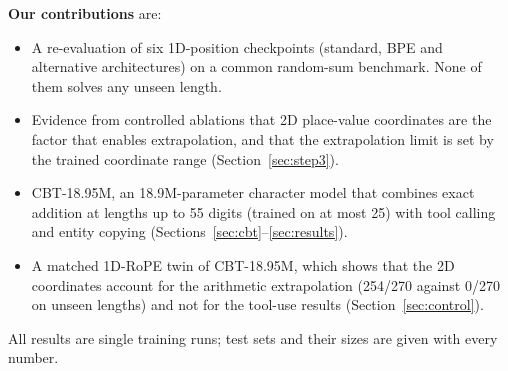 \documentclass[10pt,twocolumn]{article}
\begin{document}
\textbf{Our contributions} are:
\begin{itemize}
\item A re-evaluation of six 1D-position checkpoints (standard, BPE and alternative architectures) on a common random-sum benchmark. None of them solves any unseen length.
\item Evidence from controlled ablations that 2D place-value coordinates are the factor that enables extrapolation, and that the extrapolation limit is set by the trained coordinate range (Section~\ref{sec:step3}).
\item CBT-18.95M, an 18.9M-parameter character model that combines exact addition at lengths up to 55 digits (trained on at most 25) with tool calling and entity copying (Sections~\ref{sec:cbt}--\ref{sec:results}).
\item A matched 1D-RoPE twin of CBT-18.95M, which shows that the 2D coordinates account for the arithmetic extrapolation (254/270 against 0/270 on unseen lengths) and not for the tool-use results (Section~\ref{sec:control}).
\end{itemize}
All results are single training runs; test sets and their sizes are given with every number.
\end{document}
